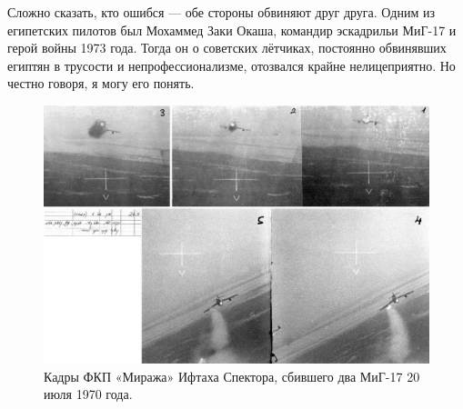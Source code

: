 Сложно сказать, кто ошибся — обе стороны обвиняют друг друга. Одним из египетских пилотов был Мохаммед Заки Окаша, командир эскадрильи МиГ-17 и герой войны 1973 года. Тогда он о советских лётчиках, постоянно обвинявших египтян в трусости и непрофессионализме, отозвался крайне нелицеприятно. Но честно говоря, я могу его понять.

\begin{figure}[h!tb] 
	\centering\includegraphics[scale=0.4]{Dolina_4/vw7qFC7JZts.jpg}
	\caption{Кадры ФКП «Миража» Ифтаха Спектора, сбившего два МиГ-17 20 июля 1970 года.}%
\end{figure}

